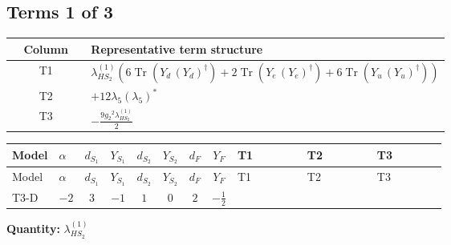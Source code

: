 \documentclass[8pt]{article}
\begin{document}
\begin{landscape}
\subsection*{Terms 1 of 3}
\begin{center}
\begin{tabular}{@{}c >{\raggedright\arraybackslash}p{0.82\linewidth}@{}}
\toprule
Column & Representative term structure \\
\midrule
T1 & \(\displaystyle {\lambda_{HS_2}^{(1)}} (6 \operatorname{Tr}\!\left({Y_d}\,\left({Y_d}\right)^{\dagger}\right)+2 \operatorname{Tr}\!\left({Y_e}\,\left({Y_e}\right)^{\dagger}\right)+6 \operatorname{Tr}\!\left({Y_u}\,\left({Y_u}\right)^{\dagger}\right))\) \\
\midrule
T2 & \(\displaystyle +12 {\lambda_5} \left({\lambda_5}\right)^{*}\) \\
\midrule
T3 & \(\displaystyle -\frac{9 {g_2}^2 {\lambda_{HS_2}^{(1)}}}{2}\) \\
\midrule
\bottomrule
\end{tabular}
\end{center}
\smallskip
\tiny
\begin{longtable}{@{}llcccccc >{\raggedright\arraybackslash}p{0.21\linewidth} >{\raggedright\arraybackslash}p{0.21\linewidth} >{\raggedright\arraybackslash}p{0.21\linewidth}@{}}
\toprule
Model & $\alpha$ & $d_{S_1}$ & $Y_{S_1}$ & $d_{S_2}$ & $Y_{S_2}$ & $d_F$ & $Y_F$ & T1 & T2 & T3 \\
\midrule
\endfirsthead
\toprule
Model & $\alpha$ & $d_{S_1}$ & $Y_{S_1}$ & $d_{S_2}$ & $Y_{S_2}$ & $d_F$ & $Y_F$ & T1 & T2 & T3 \\
\midrule
\endhead
T3-D & $-2$ & $3$ & $-1$ & $1$ & $0$ & $2$ & $-\frac{1}{2}$ & \scriptsize\adjustbox{max width=\linewidth}{$\begin{gathered} {\lambda_{HS_2}^{(1)}} (6 \operatorname{Tr}\!\left({Y_d}\,\left({Y_d}\right)^{\dagger}\right)+2 \operatorname{Tr}\!\left({Y_e}\,\left({Y_e}\right)^{\dagger}\right)+6 \operatorname{Tr}\!\left({Y_u}\,\left({Y_u}\right)^{\dagger}\right))\end{gathered}$} & \scriptsize\adjustbox{max width=\linewidth}{$\begin{gathered} +12 {\lambda_5} \left({\lambda_5}\right)^{*}\end{gathered}$} & \scriptsize\adjustbox{max width=\linewidth}{$\begin{gathered} -\frac{9 {g_2}^2 {\lambda_{HS_2}^{(1)}}}{2}\end{gathered}$} \\
\midrule
\bottomrule
\end{longtable}
\clearpage
\noindent\textbf{Quantity: }$\lambda_{HS_2}^{(1)}$\par\smallskip

\end{landscape}
\end{document}
